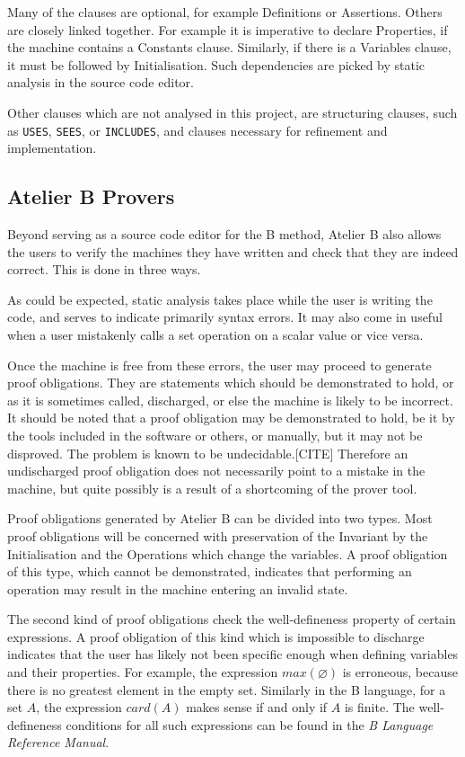 \documentclass[11pt,journal]{IEEEtran}
\begin{document}
	Many of the clauses are optional, for example Definitions or Assertions. Others are closely linked together. For example it is imperative to declare Properties, if the machine contains a Constants clause. Similarly, if there is a Variables clause, it must be followed by Initialisation. Such dependencies are picked by static analysis in the source code editor.
	
	Other clauses which are not analysed in this project, are structuring clauses, such as \texttt{USES}, \texttt{SEES}, or \texttt{INCLUDES}, and clauses necessary for refinement and implementation.
	
	\subsection{Atelier B Provers}
	Beyond serving as a source code editor for the B method, Atelier B also allows the users to verify the machines they have written and check that they are indeed correct. This is done in three ways. 
	
	As could be expected, static analysis takes place while the user is writing the code, and serves to indicate primarily syntax errors. It may also come in useful when a user mistakenly calls a set operation on a scalar value or vice versa.  
	
	Once the machine is free from these errors, the user may proceed to generate proof obligations. They are statements which should be demonstrated to hold, or as it is sometimes called, discharged, or else the machine is likely to be incorrect. It should be noted that a proof obligation may be demonstrated to hold, be it by the tools included in the software or others, or manually, but it may not be disproved. The problem is known to be undecidable.[CITE] Therefore an undischarged proof obligation does not necessarily point to a mistake in the machine, but quite possibly is a result of a shortcoming of the prover tool.
	
	Proof obligations generated by Atelier B can be divided into two types. Most proof obligations will be concerned with preservation of the Invariant by the Initialisation and the Operations which change the variables. A proof obligation of this type, which cannot be demonstrated, indicates that performing an operation may result in the machine entering an invalid state.
	
	The second kind of proof obligations check the well-defineness property of certain expressions. A proof obligation of this kind which is impossible to discharge indicates that the user has likely not been specific enough when defining variables and their properties. For example, the expression $max(\varnothing)$ is erroneous, because there is no greatest element in the empty set. Similarly in the B language, for a set $A$, the expression $card(A)$ makes sense if and only if $A$ is finite. The well-defineness conditions for all such expressions can be found in the \emph{B Language Reference Manual}\cite{b reference}.
	
\end{document}
